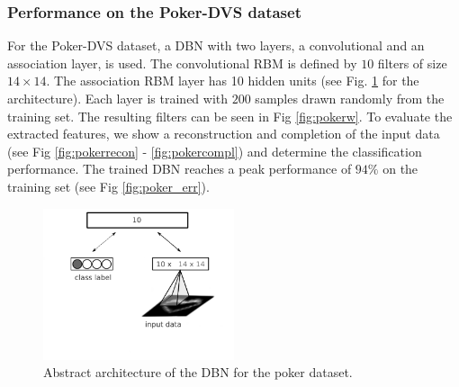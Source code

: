 \clearpage

\subsubsection{Performance on the Poker-DVS dataset} \label{c:pokerexp}

For the Poker-DVS dataset, a DBN with two layers, a convolutional and an association layer, is used.
The convolutional RBM is defined by $10$ filters of size $14 \times 14$.
The association RBM layer has 10 hidden units (see Fig. \ref{fig:pokerdbnarch} for the architecture).
Each layer is trained with $200$ samples drawn randomly from the training set.
The resulting filters can be seen in Fig \ref{fig:pokerw}.
To evaluate the extracted features, we show a reconstruction and completion of the input data (see Fig \ref{fig:pokerrecon} - \ref{fig:pokercompl}) and determine the classification performance. 
The trained DBN reaches a peak performance of $94 \%$ on the training set (see Fig \ref{fig:poker_err}).


\begin{figure}[h!]
	\centering
    	\includegraphics[width=0.5\textwidth]{imgs/poker/dbn_poker1.png} 
    \caption{Abstract architecture of the DBN for the poker dataset.}
	\label{fig:pokerdbnarch}
\end{figure}


